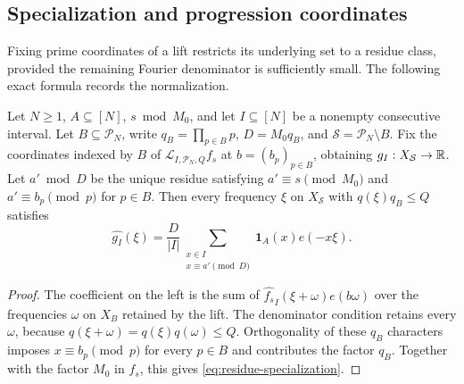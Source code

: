 \subsection{Specialization and progression coordinates}

Fixing prime coordinates of a lift restricts its underlying set to a
residue class, provided the remaining Fourier denominator is sufficiently
small.  The following exact formula records the normalization.

\begin{lemma}\label{lem:residue-specialization}
Let $N\ge1$, $A\subseteq[N]$, $s\bmod M_0$, and let $I\subseteq[N]$ be a
nonempty consecutive interval.  Let $B\subseteq\mathcal P_N$, write
$q_B=\prod_{p\in B}p$, $D=M_0q_B$, and
$\mathcal S=\mathcal P_N\setminus B$.  Fix the coordinates indexed by $B$
of $\mathcal L_{I,\mathcal P_N,Q}f_s$ at $b=(b_p)_{p\in B}$, obtaining
$g_I:X_{\mathcal S}\to\mathbb R$.  Let $a'\bmod D$ be the unique residue
satisfying $a'\equiv s\pmod{M_0}$ and $a'\equiv b_p\pmod p$ for $p\in B$.
Then every frequency $\xi$ on $X_{\mathcal S}$ with $q(\xi)q_B\le Q$
satisfies
\begin{equation}\label{eq:residue-specialization}
 \widehat{g_I}(\xi)=\frac{D}{|I|}
       \sum_{\substack{x\in I\\x\equiv a'\pmod D}}
                       \mathbf1_A(x)e(-x\xi).
\end{equation}
\end{lemma}

\begin{proof}
The coefficient on the left is the sum of
$\widehat{f_s}_I(\xi+\omega)e(b\omega)$ over the frequencies $\omega$ on
$X_B$ retained by the lift.  The denominator condition retains every
$\omega$, because $q(\xi+\omega)=q(\xi)q(\omega)\le Q$.  Orthogonality of
these $q_B$ characters imposes $x\equiv b_p\pmod p$ for every $p\in B$
and contributes the factor $q_B$.  Together with the factor $M_0$ in
$f_s$, this gives \eqref{eq:residue-specialization}.
\end{proof}

